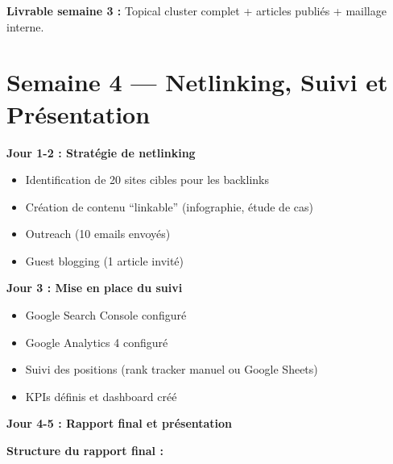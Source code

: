 \documentclass[12pt,a4paper]{report}
\begin{document}
\textbf{Livrable semaine 3 :}
Topical cluster complet + articles publiés + maillage interne.

\section{Semaine 4 --- Netlinking, Suivi et Présentation}

\textbf{Jour 1-2 : Stratégie de netlinking}
\begin{itemize}
\item[$\square$] Identification de 20 sites cibles pour les backlinks
\item[$\square$] Création de contenu ``linkable'' (infographie, étude de cas)
\item[$\square$] Outreach (10 emails envoyés)
\item[$\square$] Guest blogging (1 article invité)
\end{itemize}

\textbf{Jour 3 : Mise en place du suivi}
\begin{itemize}
\item[$\square$] Google Search Console configuré
\item[$\square$] Google Analytics 4 configuré
\item[$\square$] Suivi des positions (rank tracker manuel ou Google Sheets)
\item[$\square$] KPIs définis et dashboard créé
\end{itemize}

\textbf{Jour 4-5 : Rapport final et présentation}

\textbf{Structure du rapport final :}
\end{document}
